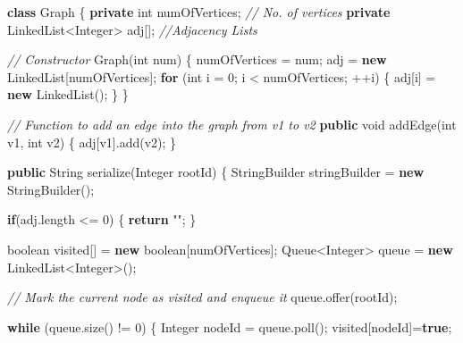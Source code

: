 \documentclass[]{book}
\newenvironment{Shaded}{\begin{snugshade}}{\end{snugshade}}
\newcommand{\BuiltInTok}[1]{#1}
\newcommand{\CommentTok}[1]{\textcolor[rgb]{0.56,0.35,0.01}{\textit{#1}}}
\newcommand{\DataTypeTok}[1]{\textcolor[rgb]{0.13,0.29,0.53}{#1}}
\newcommand{\DecValTok}[1]{\textcolor[rgb]{0.00,0.00,0.81}{#1}}
\newcommand{\FunctionTok}[1]{\textcolor[rgb]{0.00,0.00,0.00}{#1}}
\newcommand{\KeywordTok}[1]{\textcolor[rgb]{0.13,0.29,0.53}{\textbf{#1}}}
\newcommand{\NormalTok}[1]{#1}
\newcommand{\StringTok}[1]{\textcolor[rgb]{0.31,0.60,0.02}{#1}}
\begin{document}
\begin{Shaded}
\begin{Highlighting}[]
\KeywordTok{class}\NormalTok{ Graph \{}
    \KeywordTok{private} \DataTypeTok{int}\NormalTok{ numOfVertices; }\CommentTok{// No. of vertices}
    \KeywordTok{private} \BuiltInTok{LinkedList}\NormalTok{<}\BuiltInTok{Integer}\NormalTok{> adj[]; }\CommentTok{//Adjacency Lists}

    \CommentTok{// Constructor}
    \FunctionTok{Graph}\NormalTok{(}\DataTypeTok{int}\NormalTok{ num) \{}
\NormalTok{        numOfVertices = num;}
\NormalTok{        adj = }\KeywordTok{new} \BuiltInTok{LinkedList}\NormalTok{[numOfVertices];}
        \KeywordTok{for}\NormalTok{ (}\DataTypeTok{int}\NormalTok{ i = }\DecValTok{0}\NormalTok{; i < numOfVertices; ++i) \{}
\NormalTok{            adj[i] = }\KeywordTok{new} \BuiltInTok{LinkedList}\NormalTok{();}
\NormalTok{        \}}
\NormalTok{    \}}

    \CommentTok{// Function to add an edge into the graph from v1 to v2}
    \KeywordTok{public} \DataTypeTok{void} \FunctionTok{addEdge}\NormalTok{(}\DataTypeTok{int}\NormalTok{ v1, }\DataTypeTok{int}\NormalTok{ v2) \{}
\NormalTok{        adj[v1].}\FunctionTok{add}\NormalTok{(v2);}
\NormalTok{    \}}

    \KeywordTok{public} \BuiltInTok{String} \FunctionTok{serialize}\NormalTok{(}\BuiltInTok{Integer}\NormalTok{ rootId) \{}
        \BuiltInTok{StringBuilder}\NormalTok{ stringBuilder = }\KeywordTok{new} \BuiltInTok{StringBuilder}\NormalTok{();}

        \KeywordTok{if}\NormalTok{(adj.}\FunctionTok{length}\NormalTok{ <= }\DecValTok{0}\NormalTok{) \{}
            \KeywordTok{return} \StringTok{""}\NormalTok{;}
\NormalTok{        \}}

        \DataTypeTok{boolean}\NormalTok{ visited[] = }\KeywordTok{new} \DataTypeTok{boolean}\NormalTok{[numOfVertices];}
        \BuiltInTok{Queue}\NormalTok{<}\BuiltInTok{Integer}\NormalTok{> queue = }\KeywordTok{new} \BuiltInTok{LinkedList}\NormalTok{<}\BuiltInTok{Integer}\NormalTok{>();}

        \CommentTok{// Mark the current node as visited and enqueue it}
\NormalTok{        queue.}\FunctionTok{offer}\NormalTok{(rootId);}

        \KeywordTok{while}\NormalTok{ (queue.}\FunctionTok{size}\NormalTok{() != }\DecValTok{0}\NormalTok{) \{}
            \BuiltInTok{Integer}\NormalTok{ nodeId = queue.}\FunctionTok{poll}\NormalTok{();}
\NormalTok{            visited[nodeId]=}\KeywordTok{true}\NormalTok{;}


\end{Highlighting}
\end{Shaded}
\end{document}

